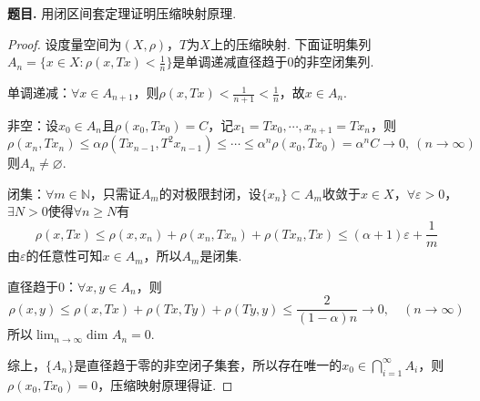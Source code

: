\documentclass[12pt, a4paper, oneside]{ctexart}
\newcounter{problem}  %
\newenvironment{problem}{\stepcounter{problem}\par\noindent\textbf{题目\arabic{problem}. }}{\smallskip\par}
\let\leq=\leqslant %
\let\geq=\geqslant %
\def\N{\mathbb{N}}          %
\begin{document}
\begin{problem}
    用闭区间套定理证明压缩映射原理.
\end{problem}
\begin{proof}
    设度量空间为$(X,\rho)$，$T$为$X$上的压缩映射. 下面证明集列$A_n = \{x\in X:\rho(x, Tx) < \frac{1}{n}\}$是单调递减直径趋于$0$的非空闭集列.

    单调递减：$\forall x\in A_{n+1}$，则$\rho(x, Tx) < \frac{1}{n+1} < \frac{1}{n}$，故$x \in A_n$.

    非空：设$x_0\in A_n$且$\rho(x_0, Tx_0) = C$，记$x_1 = Tx_0, \cdots, x_{n+1} = Tx_{n}$，则
    \begin{equation*}
        \rho(x_n, Tx_n) \leq \alpha\rho(Tx_{n-1},T^2x_{n-1}) \leq \cdots\leq \alpha^n\rho(x_0, Tx_0) = \alpha^nC\to 0,\ (n\to\infty)
    \end{equation*}
    则$A_n\neq \varnothing$.

    闭集：$\forall m\in \N$，只需证$A_m$的对极限封闭，设$\{x_n\}\subset A_m$收敛于$x\in X$，$\forall \varepsilon > 0$，$\exists N > 0$使得$\forall n\geq N$有
    \begin{equation*}
        \rho(x, Tx)\leq \rho(x, x_n) + \rho(x_n, Tx_n) + \rho(Tx_n, Tx) \leq (\alpha+1)\varepsilon + \frac{1}{m}
    \end{equation*}
    由$\varepsilon$的任意性可知$x\in A_m$，所以$A_m$是闭集.

    直径趋于$0$：$\forall x, y\in A_n$，则
    \begin{equation*}
        \rho(x, y) \leq \rho(x, Tx)+\rho(Tx, Ty) + \rho(Ty, y)\leq \frac{2}{(1-\alpha)n}\to 0,\quad(n\to\infty)
    \end{equation*}
    所以$\lim_{n\to\infty}\text{dim }A_n = 0$.

    综上，$\{A_n\}$是直径趋于零的非空闭子集套，所以存在唯一的$x_0\in \bigcap_{i=1}^\infty A_i$，则$\rho(x_0, Tx_0) = 0$，压缩映射原理得证.
\end{proof}
\iffalse
\centerline{
    \texttt{[image: figure.png]}
}
\renewcommand\arraystretch{0.8} %
\begin{table}[!htbp] %
    \centering %
    \begin{tabular}{p{1cm}<{\centering}p{1cm}<{\centering}p{3cm}<{\centering}p{5cm}<{\centering}} %
        \toprule
        $x_i$ & $f[x_1]$ & $f[x_i,x_{i+1}]$ & $f[x_i,x_{i+1},x_{i+2}]$ \\
        \midrule
        $x_0$ & $f(x_0)$ &                  &                          \\
        $x_0$ & $f(x_0)$ & $f'(x_0)$        &                          \\
        $x_0$ & $f(x_1)$ & $\frac{f(x_1)-f(x_0)}{x_1-x_0}$ & $\frac{f(x_1)-f(x_0)}{(x_1-x_0)^2}-\frac{f'(x_0)}{x_1-x_0}$\\
        \bottomrule
    \end{tabular}
\end{table}

\def\Log{\text{Log}} %
$\Log$ %
\fi
\end{document}
